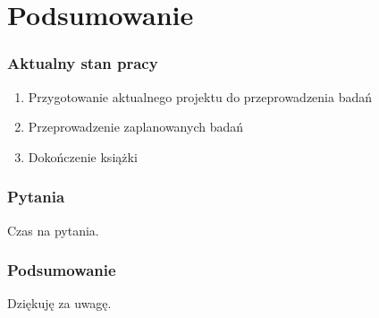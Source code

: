 \documentclass[ucs]{beamer}
\begin{document}
\section{Podsumowanie}
\begin{frame}
\frametitle{Aktualny stan pracy}
\begin{enumerate}
    \item Przygotowanie aktualnego projektu do przeprowadzenia badań
    \item Przeprowadzenie zaplanowanych badań
    \item Dokończenie książki
\end{enumerate}
\end{frame}

\begin{frame}
\frametitle{Pytania}
Czas na pytania.
\end{frame}

\begin{frame}
\frametitle{Podsumowanie}
Dziękuję za uwagę.
\end{frame}
\end{document}
